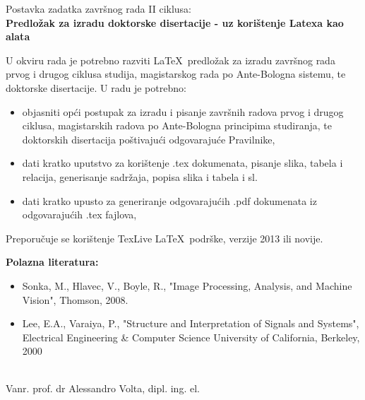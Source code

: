 \documentclass[12pt,oneside, a4paper]{book}
\begin{document}
\begin{center}
\vspace{2cm}
{\Large Postavka zadatka završnog rada II ciklusa:}\\
\vspace{0.2cm}
{\large \textbf{Predložak za izradu doktorske disertacije - uz korištenje Latexa kao alata}}
\end{center}

\vspace{0.5cm}
U okviru rada je potrebno razviti \LaTeX\ predložak za izradu završnog rada prvog i drugog ciklusa studija, magistarskog rada po Ante-Bologna sistemu, te doktorske disertacije. U radu je potrebno:
\begin{itemize}
\item objasniti opći postupak za izradu i pisanje završnih radova prvog i drugog ciklusa, magistarskih radova po Ante-Bologna principima studiranja, te doktorskih disertacija poštivajući odgovarajuće Pravilnike,
\item dati kratko uputstvo za korištenje .tex dokumenata, pisanje slika, tabela i relacija, generisanje sadržaja, popisa slika i tabela i sl.
\item dati kratko upusto za generiranje odgovarajućih .pdf dokumenata iz odgovarajućih .tex fajlova,
\end{itemize}
Preporučuje se korištenje TexLive \LaTeX\ podrške, verzije 2013 ili novije.


\vspace{1cm}
\textbf{Polazna literatura:}

\begin{itemize}
\item[]  [1] Sonka, M., Hlavec, V., Boyle, R., "Image Processing, Analysis, and Machine Vision", Thomson, 2008.
\item[] [2] Lee, E.A., Varaiya, P., "Structure and Interpretation of Signals and Systems", Electrical Engineering \& Computer Science University of California, Berkeley, 2000

\end{itemize}


\begin{center}
\vspace{2cm}
\makebox[8cm]{\hrulefill} \\
Vanr. prof. dr Alessandro Volta, dipl. ing. el.\\
\end{center}
\end{document}
